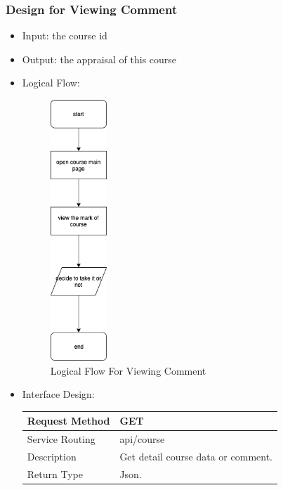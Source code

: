 \documentclass[16pt]{scrreprt}
\begin{document}
\subsubsection{Design for Viewing Comment}
\begin{itemize}
    \item Input: the course id
    \item Output: the appraisal of this course
    \item Logical Flow:
    \begin{figure}[H]
        \centering
        \includegraphics[width=0.2\textwidth]{diagrams/flow-ViewMark.png}
        \caption{Logical Flow For Viewing Comment}
    \end{figure}
    \item Interface Design: 
	\begin{center}
        \begin{tabular}{p{5cm}p{10cm}}
            \hline
            Request Method & GET\\
            \hline
            Service Routing &  api/course\\
            \hline
            Description & Get detail course data or comment.\\
            \hline
            Return Type & Json.\\
            \hline
        \end{tabular}
    \end{center}
\end{itemize}
\end{document}
